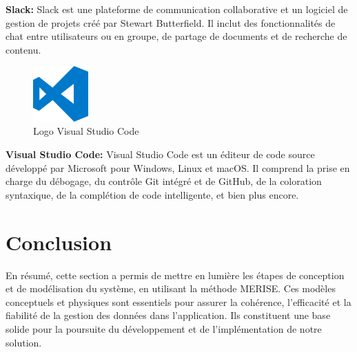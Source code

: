 \textbf{Slack:} Slack est une plateforme de communication collaborative et un logiciel de gestion de projets créé par Stewart Butterfield. Il inclut des fonctionnalités de chat entre utilisateurs ou en groupe, de partage de documents et de recherche de contenu.

\begin{figure}[h]
    \centering
    \includegraphics[width=80px]{LOGOS/vs.png}
    \caption{Logo Visual Studio Code}
    \label{fig:vscode}
\end{figure}

\textbf{Visual Studio Code:} Visual Studio Code est un éditeur de code source développé par Microsoft pour Windows, Linux et macOS. Il comprend la prise en charge du débogage, du contrôle Git intégré et de GitHub, de la coloration syntaxique, de la complétion de code intelligente, et bien plus encore.
\break
\section{Conclusion}
En résumé, cette section a permis de mettre en lumière les étapes de conception et de modélisation du système, en utilisant la méthode MERISE. Ces modèles conceptuels et physiques sont essentiels pour assurer la cohérence, l'efficacité et la fiabilité de la gestion des données dans l'application. Ils constituent une base solide pour la poursuite du développement et de l'implémentation de notre solution.